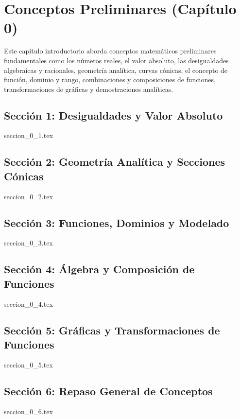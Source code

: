 \chapter{Conceptos Preliminares (Capítulo 0)}
\label{cap:preliminares}

Este capítulo introductorio aborda conceptos matemáticos preliminares fundamentales como los números reales, el valor absoluto, las desigualdades algebraicas y racionales, geometría analítica, curvas cónicas, el concepto de función, dominio y rango, combinaciones y composiciones de funciones, transformaciones de gráficas y demostraciones analíticas.

\section{Sección 1: Desigualdades y Valor Absoluto}
{seccion_0_1.tex}

\section{Sección 2: Geometría Analítica y Secciones Cónicas}
{seccion_0_2.tex}

\section{Sección 3: Funciones, Dominios y Modelado}
{seccion_0_3.tex}

\section{Sección 4: Álgebra y Composición de Funciones}
{seccion_0_4.tex}

\section{Sección 5: Gráficas y Transformaciones de Funciones}
{seccion_0_5.tex}

\section{Sección 6: Repaso General de Conceptos}
{seccion_0_6.tex}
